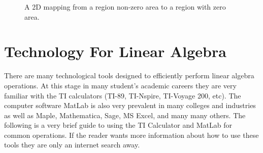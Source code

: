 \begin{figure}[ht!]
\begin{center}
    \end{center}
    \caption{A 2D mapping from a region non-zero area to a region with zero area.}
    \label{fig:determinant_vol_2}
\end{figure}




\newpage\section{Technology For Linear Algebra}
There are many technological tools designed to efficiently perform linear algebra
operations.  At this stage in many student's academic careers they are very familiar with
the TI calculators (TI-89, TI-Nspire, TI-Voyage 200, etc).  The computer software MatLab
is also very prevalent in many colleges and industries as well as Maple, Mathematica,
Sage, MS Excel, and many many others.  The following is a very brief guide to using the TI
Calculator and MatLab for common operations. If the reader wants more information about
how to use these tools they are only an internet search away.

